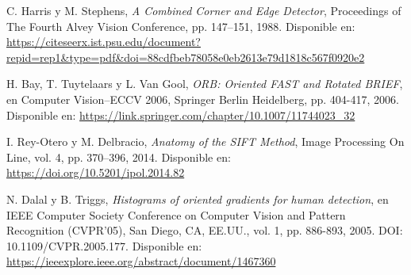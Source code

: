 \documentclass[a4paper]{article}
\begin{document}
\newpage

\begin{thebibliography}{10}

  C. Harris y M. Stephens, \emph{A Combined Corner and Edge Detector}, Proceedings of The Fourth Alvey Vision Conference, pp. 147–151, 1988. Disponible en: \url{https://citeseerx.ist.psu.edu/document?repid=rep1&type=pdf&doi=88cdfbeb78058e0eb2613e79d1818c567f0920e2}
  
  H. Bay, T. Tuytelaars y L. Van Gool, \emph{ORB: Oriented FAST and Rotated BRIEF}, en Computer Vision–ECCV 2006, Springer Berlin Heidelberg, pp. 404-417, 2006. Disponible en: \url{https://link.springer.com/chapter/10.1007/11744023_32}
  
  I. Rey-Otero y M. Delbracio, \emph{Anatomy of the SIFT Method}, Image Processing On Line, vol. 4, pp. 370–396, 2014. Disponible en: \url{https://doi.org/10.5201/ipol.2014.82}
  
  N. Dalal y B. Triggs, \emph{Histograms of oriented gradients for human detection}, en IEEE Computer Society Conference on Computer Vision and Pattern Recognition (CVPR'05), San Diego, CA, EE.UU., vol. 1, pp. 886-893, 2005. DOI: 10.1109/CVPR.2005.177. Disponible en: \url{https://ieeexplore.ieee.org/abstract/document/1467360}
  
  \end{thebibliography}
\end{document}

